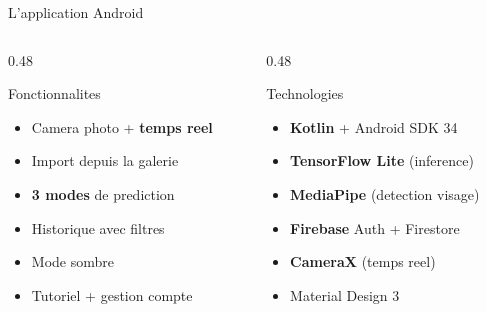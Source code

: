 \documentclass[aspectratio=169, 12pt]{beamer}
\begin{document}
\begin{frame}{L'application Android}

\begin{columns}[T]
\begin{column}{0.48\textwidth}
\begin{block}{Fonctionnalites}
{\small
\begin{itemize}
    \item Camera photo + \textbf{temps reel}
    \item Import depuis la galerie
    \item \textbf{3 modes} de prediction
    \item Historique avec filtres
    \item Mode sombre
    \item Tutoriel + gestion compte
\end{itemize}
}
\end{block}
\end{column}
\begin{column}{0.48\textwidth}
\begin{block}{Technologies}
{\small
\begin{itemize}
    \item \textbf{Kotlin} + Android SDK 34
    \item \textbf{TensorFlow Lite} (inference)
    \item \textbf{MediaPipe} (detection visage)
    \item \textbf{Firebase} Auth + Firestore
    \item \textbf{CameraX} (temps reel)
    \item Material Design 3
\end{itemize}
}
\end{block}
\end{column}
\end{columns}
\end{frame}
\end{document}
